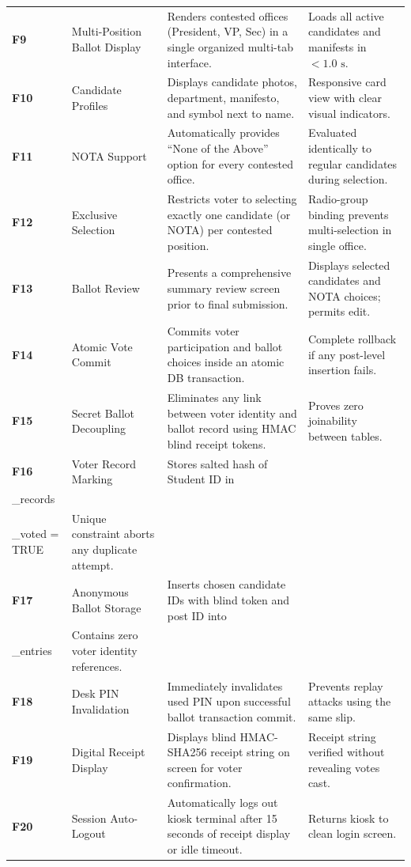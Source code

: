 \documentclass[12pt,a4paper,oneside]{report}
\begin{document}
\begin{longtable}{p{1.8cm} p{4.2cm} p{4.8cm} p{3.2cm}}
    \textbf{F9} & Multi-Position Ballot Display & Renders contested offices (President, VP, Sec) in a single organized multi-tab interface. & Loads all active candidates and manifests in $<1.0\text{ s}$. \\
    \textbf{F10} & Candidate Profiles & Displays candidate photos, department, manifesto, and symbol next to name. & Responsive card view with clear visual indicators. \\
    \textbf{F11} & NOTA Support & Automatically provides ``None of the Above'' option for every contested office. & Evaluated identically to regular candidates during selection. \\
    \textbf{F12} & Exclusive Selection & Restricts voter to selecting exactly one candidate (or NOTA) per contested position. & Radio-group binding prevents multi-selection in single office. \\
    \textbf{F13} & Ballot Review & Presents a comprehensive summary review screen prior to final submission. & Displays selected candidates and NOTA choices; permits edit. \\
    \textbf{F14} & Atomic Vote Commit & Commits voter participation and ballot choices inside an atomic DB transaction. & Complete rollback if any post-level insertion fails. \\
    \textbf{F15} & Secret Ballot Decoupling & Eliminates any link between voter identity and ballot record using HMAC blind receipt tokens. & Proves zero joinability between tables. \\
    \textbf{F16} & Voter Record Marking & Stores salted hash of Student ID in \texttt{voter\\\_records} and sets \texttt{has\\\_voted = TRUE}. & Unique constraint aborts any duplicate attempt. \\
    \textbf{F17} & Anonymous Ballot Storage & Inserts chosen candidate IDs with blind token and post ID into \texttt{ballot\\\_entries}. & Contains zero voter identity references. \\
    \textbf{F18} & Desk PIN Invalidation & Immediately invalidates used PIN upon successful ballot transaction commit. & Prevents replay attacks using the same slip. \\
    \textbf{F19} & Digital Receipt Display & Displays blind HMAC-SHA256 receipt string on screen for voter confirmation. & Receipt string verified without revealing votes cast. \\
    \textbf{F20} & Session Auto-Logout & Automatically logs out kiosk terminal after 15 seconds of receipt display or idle timeout. & Returns kiosk to clean login screen. \\

\end{longtable}
\end{document}

